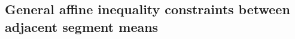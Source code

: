 \documentclass{article}
\begin{document}
\subsection{General affine inequality constraints
  between adjacent segment means}
\label{sec:general}




\end{document}

